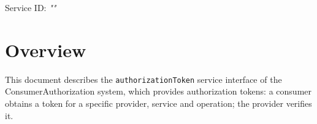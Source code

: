 \documentclass[a4paper]{arrowhead}
\begin{document}
\sloppy

\ArrowheadSetup

\begin{center}
  \vspace*{1cm}
  \huge{\arrowtitle}

  \vspace*{0.2cm}
  \LARGE{\arrowtype}
  \vspace*{1cm}

  \Large{Service ID: \textit{"\arrowid"}}

  \vspace*{\fill}


  \vspace*{1cm}
  \vspace*{\fill}

  \begin{abstract}
    This document describes the HTTP/1.1 protocol with TLS payload security and JSON payload encoding variant of the \texttt{authorizationToken} service of the ConsumerAuthorization system.
  \end{abstract}

  \vspace*{1cm}
\end{center}

\newpage

\tableofcontents
\newpage

\section{Overview}
\label{sec:overview}

This document describes the \texttt{authorizationToken} service interface of the ConsumerAuthorization system, which provides authorization tokens: a consumer obtains a token for a specific provider, service and operation; the provider verifies it.
\end{document}
